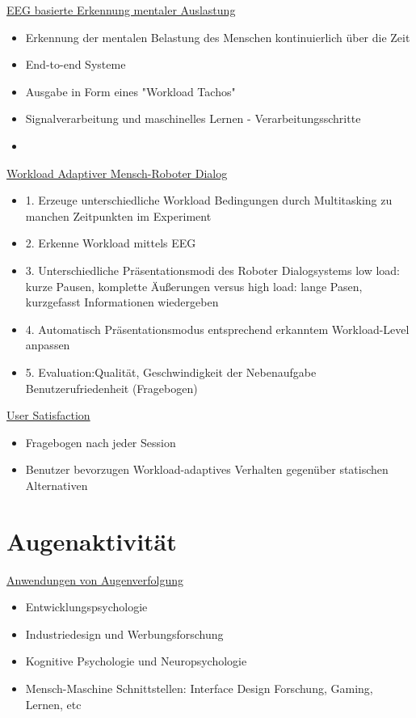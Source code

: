 \documentclass[a4paper,10pt,oneside]{article}
\begin{document}
\underline{EEG basierte Erkennung mentaler Auslastung} \\  	
 	\begin{itemize}
 		\item Erkennung der mentalen Belastung des Menschen kontinuierlich über die Zeit
 		\item End-to-end Systeme
 		\item Ausgabe in Form eines "Workload Tachos"
 		\item Signalverarbeitung und maschinelles Lernen - Verarbeitungsschritte
 		\item[] %
 	\end{itemize}

\underline{Workload Adaptiver Mensch-Roboter Dialog} \\  
	\begin{itemize}
		\item 1. Erzeuge unterschiedliche Workload Bedingungen durch Multitasking zu manchen Zeitpunkten im Experiment
		\item 2. Erkenne Workload mittels EEG
		\item 3. Unterschiedliche Präsentationsmodi des Roboter Dialogsystems low load: kurze Pausen, komplette Äußerungen versus high load: lange Pasen, kurzgefasst Informationen wiedergeben
		\item 4. Automatisch Präsentationsmodus entsprechend erkanntem Workload-Level anpassen
		\item 5. Evaluation:Qualität, Geschwindigkeit der Nebenaufgabe
Benutzerufriedenheit (Fragebogen)
	\end{itemize}
 		
\underline{User Satisfaction} \\  
	\begin{itemize}
		\item Fragebogen nach jeder Session
		\item Benutzer bevorzugen Workload-adaptives Verhalten gegenüber statischen Alternativen
	\end{itemize}
	
	
\section{Augenaktivität}
\underline{Anwendungen von Augenverfolgung} \\
	\begin{itemize}
		\item Entwicklungspsychologie
		\item Industriedesign und Werbungsforschung
		\item Kognitive Psychologie und Neuropsychologie
		\item Mensch-Maschine Schnittstellen: Interface Design Forschung, Gaming, Lernen, etc
	\end{itemize}
\end{document}
